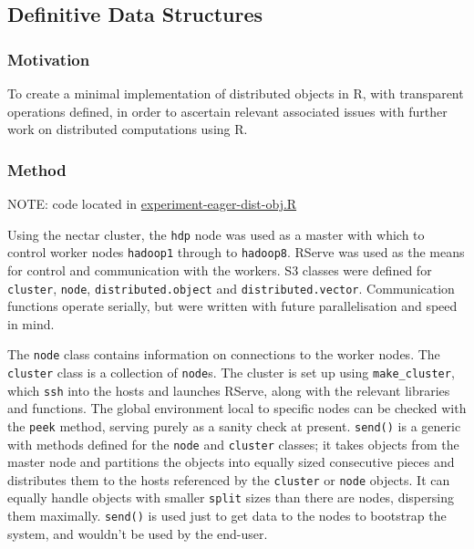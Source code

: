 \subsection{Definitive Data Structures}\label{sec:mw-ds}

\hypertarget{motivation}{%
\subsubsection{Motivation}\label{motivation}}

To create a minimal implementation of distributed objects in R, with
transparent operations defined, in order to ascertain relevant
associated issues with further work on distributed computations using R.

\hypertarget{method}{%
\subsubsection{Method}\label{method}}

NOTE: \R code located in
\href{github.com/jcai89/phd/src/experiment-eager-dist-obj.R}{experiment-eager-dist-obj.R}

Using the nectar cluster, the \texttt{hdp} node was used as a master
with which to control worker nodes \texttt{hadoop1} through to
\texttt{hadoop8}. RServe was used as the means for control and
communication with the workers. S3 classes were defined for
\texttt{cluster}, \texttt{node}, \texttt{distributed.object} and
\texttt{distributed.vector}. Communication functions operate serially,
but were written with future parallelisation and speed in mind.

The \texttt{node} class contains information on connections to the
worker nodes. The \texttt{cluster} class is a collection of
\texttt{node}s. The cluster is set up using \texttt{make\_cluster},
which \texttt{ssh} into the hosts and launches RServe, along with the
relevant libraries and functions. The global environment local to
specific nodes can be checked with the \texttt{peek} method, serving
purely as a sanity check at present. \texttt{send()} is a generic with
methods defined for the \texttt{node} and \texttt{cluster} classes; it
takes objects from the master node and partitions the objects into
equally sized consecutive pieces and distributes them to the hosts
referenced by the \texttt{cluster} or \texttt{node} objects. It can
equally handle objects with smaller \texttt{split} sizes than there are
nodes, dispersing them maximally. \texttt{send()} is used just to get
data to the nodes to bootstrap the system, and wouldn't be used by the
end-user.

